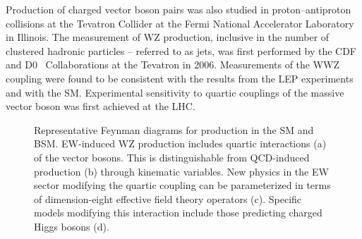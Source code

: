 Production of charged vector boson pairs was also studied in proton--antiproton
collisions at the Tevatron Collider at the Fermi National Accelerator Laboratory
in Illinois. The measurement of WZ production, inclusive in the
number of clustered hadronic particles -- referred to as jets, was
first performed by the CDF~\cite{Aaltonen:2012vu,Abulencia:2007tu} 
and D0~\cite{Abazov:2012cj} Collaborations at the Tevatron in 2006. 
Measurements of the WWZ coupling were found to be consistent with the results
from the LEP experiments and with the SM.
Experimental sensitivity to quartic couplings of the massive vector boson 
was first achieved at the LHC.

\begin{figure}[htbp]
  \centering
   \qquad
   \qquad
   \qquad
   \qquad
  \caption{Representative Feynman diagrams for \WZjj production in the SM and BSM. 
  EW-induced WZ production includes quartic interactions (a) of the vector bosons.
  This is distinguishable from QCD-induced production (b) through kinematic variables.
  New physics in the EW sector modifying the quartic coupling 
  can be parameterized in terms of dimension-eight effective field theory operators (c).
  Specific models modifying this interaction include those predicting charged Higgs bosons (d).
  }
 \label{fig:feynmanDiagrams}
\end{figure}


